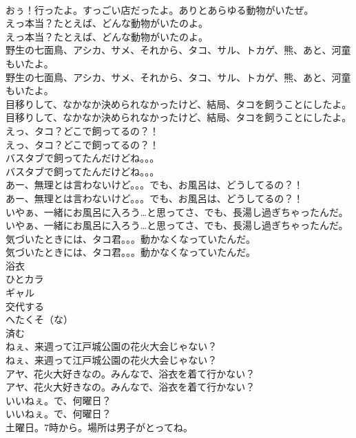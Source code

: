 \documentclass[8pt]{extreport}
\begin{document}
\begin{CJK}{UTF8}{min}
\\	おぅ！行ったよ。すっごい店だったよ。ありとあらゆる動物がいたぜ。 
\\	えっ本当？たとえば、どんな動物がいたのよ。	
\\	えっ本当？たとえば、どんな動物がいたのよ。 
\\	野生の七面鳥、アシカ、サメ、それから、タコ、サル、トカゲ、熊、あと、河童もいたよ。	
\\	野生の七面鳥、アシカ、サメ、それから、タコ、サル、トカゲ、熊、あと、河童もいたよ。 
\\	目移りして、なかなか決められなかったけど、結局、タコを飼うことにしたよ。	
\\	目移りして、なかなか決められなかったけど、結局、タコを飼うことにしたよ。 
\\	えっ、タコ？どこで飼ってるの？！	
\\	えっ、タコ？どこで飼ってるの？！ 
\\	バスタブで飼ってたんだけどね。。。	
\\	バスタブで飼ってたんだけどね。。。 
\\	あー、無理とは言わないけど。。。でも、お風呂は、どうしてるの？！	
\\	あー、無理とは言わないけど。。。でも、お風呂は、どうしてるの？！ 
\\	いやぁ、一緒にお風呂に入ろう…と思ってさ、でも、長湯し過ぎちゃったんだ。	
\\	いやぁ、一緒にお風呂に入ろう…と思ってさ、でも、長湯し過ぎちゃったんだ。 
\\	気づいたときには、タコ君。。。動かなくなっていたんだ。	
\\	気づいたときには、タコ君。。。動かなくなっていたんだ。 
\\	浴衣
\\	ひとカラ
\\	ギャル
\\	交代する
\\	へたくそ（な）
\\	済む
\\	ねぇ、来週って江戸城公園の花火大会じゃない？	
\\	ねぇ、来週って江戸城公園の花火大会じゃない？ 
\\	アヤ、花火大好きなの。みんなで、浴衣を着て行かない？	
\\	アヤ、花火大好きなの。みんなで、浴衣を着て行かない？ 
\\	いいねぇ。で、何曜日？	
\\	いいねぇ。で、何曜日？ 
\\	土曜日。7時から。場所は男子がとってね。	

\end{CJK}
\end{document}
